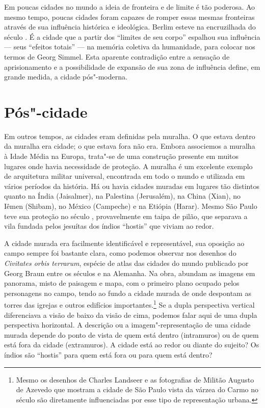 Em poucas cidades no mundo a ideia de fronteira e de limite é tão
poderosa. Ao mesmo tempo, poucas cidades foram capazes de romper essas
mesmas fronteiras através de sua influência histórica e ideológica.
Berlim esteve na encruzilhada do século . É a cidade que a partir dos
``limites de seu corpo'' espalhou sua influência --- seus ``efeitos
totais'' --- na memória coletiva da humanidade, para colocar nos termos
de Georg Simmel. Esta aparente contradição entre a sensação de
aprisionamento e a possibilidade de expansão de sua zona de influência
define, em grande medida, a cidade pós"-moderna.

\chapter{Pós"-cidade}

Em outros tempos, as cidades eram definidas pela muralha. O que estava
dentro da muralha era cidade; o que estava fora não era. Embora
associemos a muralha à Idade Média na Europa, trata"-se de uma construção
presente em muitos lugares onde havia necessidade de proteção. A muralha
é um excelente exemplo de arquitetura militar universal, encontrada em
todo o mundo e utilizada em vários períodos da história. Há ou havia
cidades muradas em lugares tão distintos quanto na Índia (Jaisalmer), na
Palestina (Jerusalém), na China (Xian), no Iêmen (Shibam), no México
(Campeche) e na Etiópia (Harar). Mesmo São Paulo teve sua proteção no
século , provavelmente em taipa de pilão, que separava a vila fundada
pelos jesuítas dos índios ``hostis'' que viviam ao redor.

A cidade murada era facilmente identificável e representável, sua
oposição ao campo sempre foi bastante clara, como podemos observar nos
desenhos do \emph{Civitates orbis terrarum}, espécie de atlas das
cidades do mundo publicado por Georg Braun entre os séculos  e 
na Alemanha. Na obra, abundam as imagens em panorama, misto de paisagem
e mapa, com o primeiro plano ocupado pelos personagens no campo, tendo
ao fundo a cidade murada de onde despontam as torres das igrejas e
outros edifícios importantes.\footnote{Mesmo os desenhos de Charles
  Landseer e as fotografias de Militão Augusto de Azevedo que mostram a
  cidade de São Paulo vista da várzea do Carmo no século  são
  diretamente influenciadas por esse tipo de representação urbana.} Se a
dupla perspectiva vertical diferenciava a visão de baixo da visão de
cima, podemos falar aqui de uma dupla perspectiva horizontal. A
descrição ou a imagem"-representação de uma cidade murada depende do
ponto de vista de quem está dentro (intramuros) ou de quem está fora da
cidade (extramuros). A cidade está ao redor ou diante do sujeito? Os
índios são ``hostis'' para quem está fora ou para quem está dentro?

